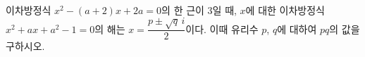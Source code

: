이차방정식 $x^2-(a+2)x+2a=0$의 한 근이 $3$일 때, $x$에 대한 이차방정식 $x^2+ax+a^2-1=0$의 해는 $x=\dfrac{p\pm\sqrt{q}\,i}{2}$이다. 이때 유리수 $p$, $q$에 대하여 $pq$의 값을 구하시오. 
